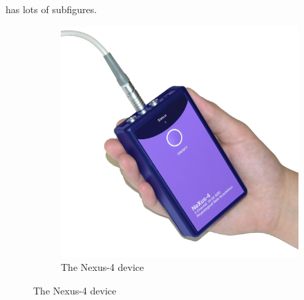  has lots of subfigures.

\begin{figure}
	\centering
	\begin{subfigure}{\textwidth}
		\includegraphics[width=\textwidth] {Figures/nexus.jpg}
		\caption{The Nexus-4 device}
	\end{subfigure}
	

\end{figure}

